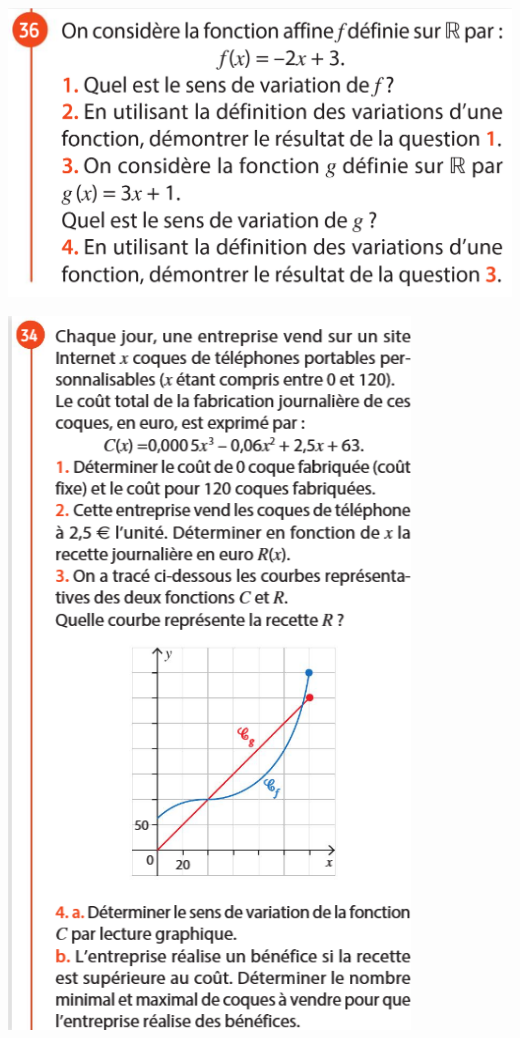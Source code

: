 \documentclass{article}
\begin{document}
\begin{center}
\begin{minipage}{0.45\textwidth}
\includegraphics[width=\textwidth]{Exercice_6.png}
\end{minipage}
\newpage
\includegraphics[width=0.8\textwidth]{Exercice_1.png}
\end{center}
\end{document}
